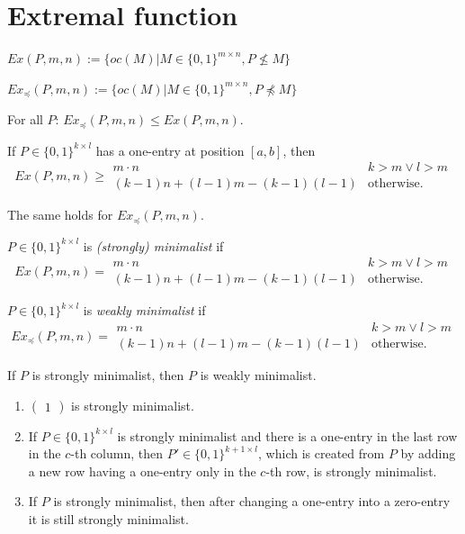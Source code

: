\documentclass[12pt,a4paper]{report}
\let\openright=\clearpage
\begin{document}
\section{Extremal function}
\begin{defn}
$Ex(P,m,n):=\{oc(M)|M\in\{0,1\}^{m\times n},P\not\leq M\}$
\end{defn}
\begin{defn}
$Ex_{\preceq}(P,m,n):=\{oc(M)|M\in\{0,1\}^{m\times n},P\not\preceq M\}$
\end{defn}
\begin{obs}
For all $P$: $Ex_{\preceq}(P,m,n)\leq Ex(P,m,n)$.
\end{obs}
\begin{obs}
If $P\in\{0,1\}^{k\times l}$ has a one-entry at position $[a,b]$, then $$Ex(P,m,n)\geq\begin{array}{ll}
m\cdot n & k>m\vee l>m \\
(k-1)n+(l-1)m-(k-1)(l-1) & \text{otherwise.}
\end{array}$$
\end{obs}
\begin{obs}
The same holds for $Ex_{\preceq}(P,m,n).$
\end{obs}
\begin{defn}
$P\in\{0,1\}^{k\times l}$ is \emph{(strongly) minimalist} if
$$Ex(P,m,n)=\begin{array}{ll}
m\cdot n & k>m\vee l>m \\
(k-1)n+(l-1)m-(k-1)(l-1) & \text{otherwise.}
\end{array}$$
\end{defn}
\begin{defn}
$P\in\{0,1\}^{k\times l}$ is \emph{weakly minimalist} if
$$Ex_{\preceq}(P,m,n)=\begin{array}{ll}
m\cdot n & k>m\vee l>m \\
(k-1)n+(l-1)m-(k-1)(l-1) & \text{otherwise.}
\end{array}$$
\end{defn}
\begin{obs}
If $P$ is strongly minimalist, then $P$ is weakly minimalist.
\end{obs}
\begin{fct}
\begin{enumerate}
\item $\left(\begin{smallmatrix}1\end{smallmatrix}\right)$ is strongly minimalist.
\item If $P\in\{0,1\}^{k\times l}$ is strongly minimalist and there is a one-entry in the last row in the $c$-th column, then $P'\in\{0,1\}^{k+1\times l}$, which is created from $P$ by adding a new row having a one-entry only in the $c$-th row, is strongly minimalist.
\item If $P$ is strongly minimalist, then after changing a one-entry into a zero-entry it is still strongly minimalist.
\end{enumerate}
\end{fct}

\openright
\end{document}
